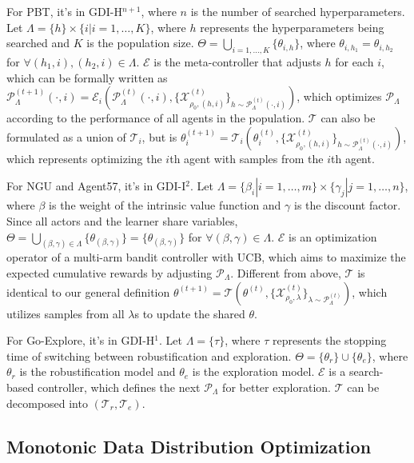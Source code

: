 \documentclass[nohyperref]{article}
\theoremstyle{plain}
\begin{document}
For PBT, it's in GDI-H$^{n+1}$, where $n$ is the number of  searched hyperparameters.
Let $\Lambda = \{h\} \times \{i| i=1,\dots, K\}$, where $h$ represents the hyperparameters being searched and $K$ is the population size.
$\Theta = \bigcup_{i=1,\dots, K} \{\theta_{i, h}\}$, where $\theta_{i, h_1} = \theta_{i, h_2}$ for $\forall (h_1, i), (h_2, i) \in \Lambda$.
$\mathcal{E}$ is the meta-controller that adjusts $h$ for each $i$, which can be formally written as 
$\mathcal{P}_{\Lambda}^{(t+1)}(\cdot, i)
= \mathcal{E}_{i}(\mathcal{P}_{\Lambda}^{(t)}(\cdot, i), \{\mathcal{X}^{(t)}_{\rho_0, (h, i)}\}_{h \sim \mathcal{P}^{(t)}_{\Lambda}(\cdot, i)} )$,
which optimizes $\mathcal{P}_{\Lambda}$ according to the performance of all agents in the population.
$\mathcal{T}$ can also be formulated as a union of $\mathcal{T}_i$, but is 
$\theta^{(t+1)}_i 
= \mathcal{T}_{i}( \theta^{(t)}_i, \{\mathcal{X}^{(t)}_{\rho_0, (h, i)}\}_{h \sim \mathcal{P}^{(t)}_{\Lambda}(\cdot, i)})$,
which represents optimizing the $i$th agent with samples from the $i$th agent.

For NGU and Agent57, it's in GDI-I$^2$. 
Let $\Lambda = \{\beta_i | i=1,\dots,m\} \times \{\gamma_j | j=1,\dots,n\}$, where $\beta$ is the weight of the intrinsic value function and $\gamma$ is the discount factor.
Since all actors and the learner share variables, $\Theta = \bigcup_{(\beta, \gamma) \in \Lambda} \{\theta_{(\beta, \gamma)}\} = \{\theta_{(\beta, \gamma)}\}$ for $\forall (\beta, \gamma) \in \Lambda$.
$\mathcal{E}$ is an optimization operator of a multi-arm bandit controller with UCB, which aims to maximize the expected cumulative rewards by adjusting $\mathcal{P}_{\Lambda}$.
Different from above, $\mathcal{T}$ is identical to our general definition $\theta^{(t+1)} 
= \mathcal{T}( \theta^{(t)}, \{\mathcal{X}^{(t)}_{\rho_0, \lambda}\}_{\lambda \sim \mathcal{P}^{(t)}_{\Lambda}} )$,
which utilizes samples from all $\lambda$s to update the shared $\theta$.


For Go-Explore, it's in GDI-H$^1$. 
Let $\Lambda = \{\tau\}$, where $\tau$ represents the stopping time of switching between robustification and exploration.
$\Theta = \{\theta_r\} \cup \{\theta_e\}$, where $\theta_r$ is the robustification model and $\theta_e$ is the exploration model.
$\mathcal{E}$ is a search-based controller, which defines the next $\mathcal{P}_{\Lambda}$ for better exploration.
$\mathcal{T}$ can be decomposed into $(\mathcal{T}_r, \mathcal{T}_e)$.

\subsection{Monotonic Data Distribution Optimization}
\label{sec: Monotonic Data Distribution Optimization}
\end{document}
